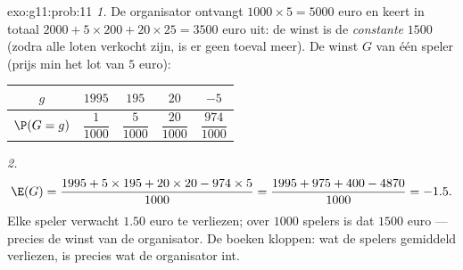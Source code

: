 \begin{solution}{exo:g11:prob:11}
\emph{1.} De organisator ontvangt $1000 \times 5 = 5000$ euro en keert in
totaal $2000 + 5 \times 200 + 20 \times 25 = 3500$ euro uit: de winst is de
\emph{constante} $1500$ (zodra alle loten verkocht zijn, is er geen toeval
meer). De winst $G$ van één speler (prijs min het lot van $5$ euro):
\begin{center}
\begin{tabular}{c|cccc}
$g$ & $1995$ & $195$ & $20$ & $-5$\\
\hline\rule{0pt}{11pt}%
$\P(G=g)$ & $\dfrac{1}{1000}$ & $\dfrac{5}{1000}$ & $\dfrac{20}{1000}$
& $\dfrac{974}{1000}$
\end{tabular}
\end{center}

\emph{2.}
\[
\E(G) = \frac{1995 + 5 \times 195 + 20 \times 20 - 974 \times 5}{1000}
= \frac{1995 + 975 + 400 - 4870}{1000} = -1.5 .
\]
Elke speler verwacht $1.50$ euro te verliezen; over $1000$ spelers is dat
$1500$ euro --- precies de winst van de organisator. De boeken kloppen: wat
de spelers gemiddeld verliezen, is precies wat de organisator int.
\end{solution}

